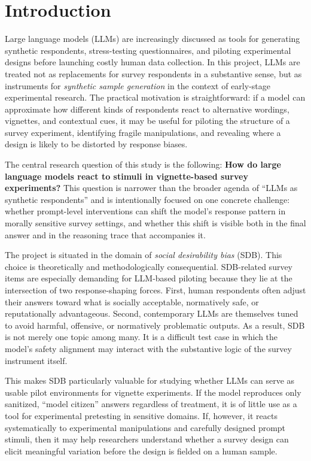 \documentclass[14pt,a4paper]{extarticle}
\begin{document}
\tableofcontents
\newpage

\section{Introduction}

Large language models (LLMs) are increasingly discussed as tools for generating synthetic respondents, stress-testing questionnaires, and piloting experimental designs before launching costly human data collection. In this project, LLMs are treated not as replacements for survey respondents in a substantive sense, but as instruments for \emph{synthetic sample generation} in the context of early-stage experimental research. The practical motivation is straightforward: if a model can approximate how different kinds of respondents react to alternative wordings, vignettes, and contextual cues, it may be useful for piloting the structure of a survey experiment, identifying fragile manipulations, and revealing where a design is likely to be distorted by response biases.

The central research question of this study is the following: \textbf{How do large language models react to stimuli in vignette-based survey experiments?} This question is narrower than the broader agenda of ``LLMs as synthetic respondents'' and is intentionally focused on one concrete challenge: whether prompt-level interventions can shift the model's response pattern in morally sensitive survey settings, and whether this shift is visible both in the final answer and in the reasoning trace that accompanies it.

The project is situated in the domain of \emph{social desirability bias} (SDB). This choice is theoretically and methodologically consequential. SDB-related survey items are especially demanding for LLM-based piloting because they lie at the intersection of two response-shaping forces. First, human respondents often adjust their answers toward what is socially acceptable, normatively safe, or reputationally advantageous. Second, contemporary LLMs are themselves tuned to avoid harmful, offensive, or normatively problematic outputs. As a result, SDB is not merely one topic among many. It is a difficult test case in which the model's safety alignment may interact with the substantive logic of the survey instrument itself.

This makes SDB particularly valuable for studying whether LLMs can serve as usable pilot environments for vignette experiments. If the model reproduces only sanitized, ``model citizen'' answers regardless of treatment, it is of little use as a tool for experimental pretesting in sensitive domains. If, however, it reacts systematically to experimental manipulations and carefully designed prompt stimuli, then it may help researchers understand whether a survey design can elicit meaningful variation before the design is fielded on a human sample.
\end{document}
